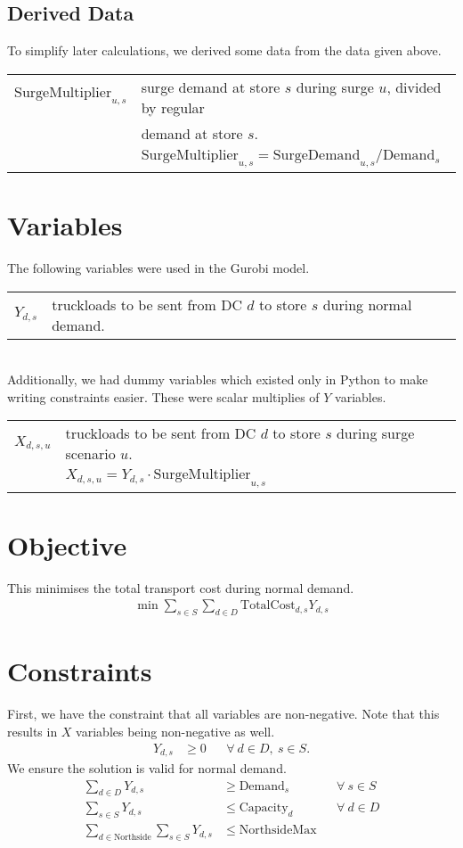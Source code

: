 \documentclass[11pt,a4paper]{article}
\begin{document}
\subsection{Derived Data}
To simplify later calculations, we derived some data from the data given above.\\[0.8em]    
\begin{tabular}{l l}
    $\mathrm{SurgeMultiplier}_{u,s}$ & surge demand at store $s$ during surge $u$,  divided by regular \\ 
    &  demand at store $s$. \\ 
    &$\mathrm{SurgeMultiplier}_{u,s} = \mathrm{SurgeDemand}_{u,s} / \mathrm{Demand}_s $
\end{tabular}

\section{Variables}
The following variables were used in the Gurobi model.\\[0.8em]
\begin{tabular}{l l}
    $Y_{d,s}$ & truckloads to be sent from DC $d$ to store $s$ during normal demand.
\end{tabular}
\\[0.8em]
\noindent Additionally, we had dummy variables which existed only in Python to 
make writing constraints easier. These were scalar multiplies of $Y$ variables.\\[0.8em]
\begin{tabular}{l l}
    $X_{d,s,u}$ & truckloads to be sent from DC $d$ to store $s$ during 
    surge scenario $u$. \\ 
    & $X_{d,s,u} = Y_{d,s} \cdot \mathrm{SurgeMultiplier}_{u,s}$
\end{tabular}

\section{Objective}
This minimises the total transport cost during normal demand.
\begin{align*}
    \min \sum_{s \in S} \sum_{d \in D} \mathrm{TotalCost}_{d, s} Y_{d,s}
\end{align*}

\section{Constraints}
First, we have the constraint that all variables are non-negative. Note that this results in 
$X$ variables being non-negative as well.
\begin{align*}
    Y_{d,s} &\ge 0 &&\forall~d \in D,~s \in S.
\end{align*}
We ensure the solution is valid for normal demand.
\begin{align*}
    \sum_{d \in D} Y_{d,s} &\ge \mathrm{Demand}_{s} &&\forall~s \in S \\ 
    \sum_{s \in S} Y_{d,s} &\le \mathrm{Capacity}_d &&\forall~d \in D \\ 
    \sum_{d \in \mathrm{Northside}} \sum_{s \in S} Y_{d,s} &\le \mathrm{NorthsideMax}
\end{align*}
\end{document}
